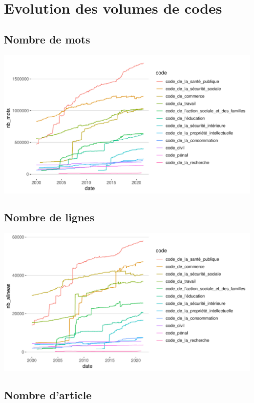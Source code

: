 \documentclass[
  oneside]{book}
\begin{document}
\hypertarget{evolution-des-volumes-de-codes}{%
\section{Evolution des volumes de codes}\label{evolution-des-volumes-de-codes}}

\hypertarget{nombre-de-mots}{%
\subsection{Nombre de mots}\label{nombre-de-mots}}

\includegraphics{05-images_files/figure-latex/nb_mots-1.pdf}

\hypertarget{nombre-de-lignes}{%
\subsection{Nombre de lignes}\label{nombre-de-lignes}}

\includegraphics{05-images_files/figure-latex/nb_alineas-1.pdf}

\hypertarget{nombre-darticle}{%
\subsection{Nombre d'article}\label{nombre-darticle}}
\end{document}
